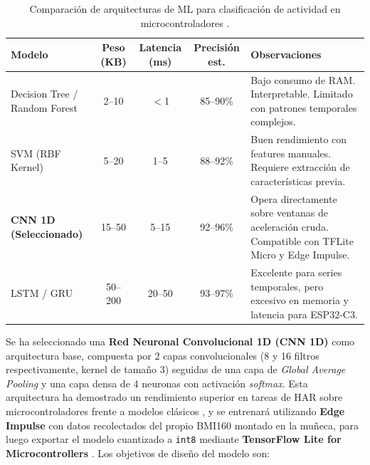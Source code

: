 \documentclass[letterpaper,11pt]{article}
\begin{document}
\begin{table}[H]
    \centering
    \renewcommand{\arraystretch}{1.3}
    \begin{tabular}{|L{3cm}|c|c|c|L{4.5cm}|}
        \hline
        \textbf{Modelo}                   & \textbf{Peso (KB)} & \textbf{Latencia (ms)} & \textbf{Precisión est.} & \textbf{Observaciones}                                                                        \\ \hline
        Decision Tree / Random Forest      & 2--10             & $<$1                    & 85--90\%                 & Bajo consumo de RAM. Interpretable. Limitado con patrones temporales complejos.             \\ \hline
        SVM (RBF Kernel)                   & 5--20              & 1--5                    & 88--92\%                 & Buen rendimiento con features manuales. Requiere extracción de características previa.        \\ \hline
        \textbf{CNN 1D (Seleccionado)}     & 15--50             & 5--15                   & 92--96\%                 & Opera directamente sobre ventanas de aceleración cruda. Compatible con TFLite Micro y Edge Impulse. \\ \hline
        LSTM / GRU                         & 50--200            & 20--50                  & 93--97\%                 & Excelente para series temporales, pero excesivo en memoria y latencia para ESP32-C3.          \\ \hline
    \end{tabular}
    \caption{Comparación de arquitecturas de ML para clasificación de actividad en microcontroladores \citep{har_tinyml}.}
    \label{tab:ml_models}
\end{table}

Se ha seleccionado una \textbf{Red Neuronal Convolucional 1D (CNN 1D)} como arquitectura base, compuesta por 2 capas convolucionales (8 y 16 filtros respectivamente, kernel de tamaño 3) seguidas de una capa de \textit{Global Average Pooling} y una capa densa de 4 neuronas con activación \textit{softmax}. Esta arquitectura ha demostrado un rendimiento superior en tareas de HAR sobre microcontroladores frente a modelos clásicos \citep{har_tinyml}, y se entrenará utilizando \textbf{Edge Impulse} \citep{edge_impulse} con datos recolectados del propio BMI160 \citep{bmi160_ds} montado en la muñeca, para luego exportar el modelo cuantizado a \texttt{int8} mediante \textbf{TensorFlow Lite for Microcontrollers} \citep{tflite_micro}. Los objetivos de diseño del modelo son:
\end{document}
